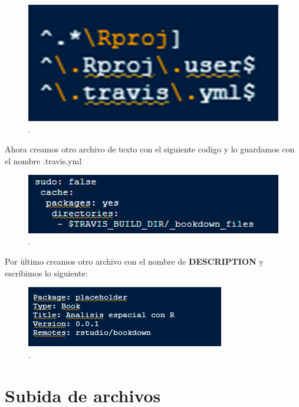\documentclass[
  11pt,
  spanish,
  oneside]{book}
\begin{document}
\begin{figure}

{\centering \includegraphics[width=0.7\linewidth]{imagenes/Imagen 6} 

}

\caption{.}\label{fig:unnamed-chunk-6}
\end{figure}

Ahora creamos otro archivo de texto con el siguiente codigo y lo guardamos con el nombre .travis.yml

\begin{figure}

{\centering \includegraphics[width=0.7\linewidth]{imagenes/Imagen 7} 

}

\caption{.}\label{fig:unnamed-chunk-7}
\end{figure}

Por ùltimo creamos otro archivo con el nombre de \textbf{DESCRIPTION} y escribimos lo siguiente:

\begin{figure}

{\centering \includegraphics[width=0.7\linewidth]{imagenes/Imagen 8} 

}

\caption{.}\label{fig:unnamed-chunk-8}
\end{figure}

\hypertarget{subida-de-archivos}{%
\chapter*{Subida de archivos}\label{subida-de-archivos}}
\end{document}

